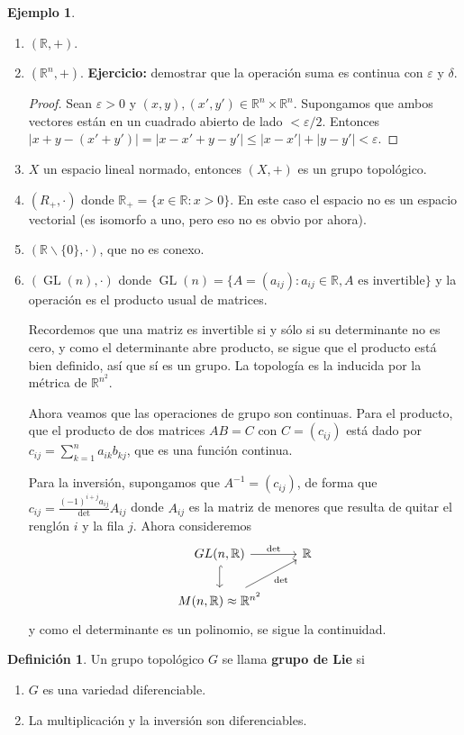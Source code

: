 \documentclass[spanish]{article}
\theoremstyle{definition}
\newtheorem*{defn}{Definición}
\newtheorem*{ejem}{Ejemplo}
\newcommand{\R}{\mathbb{R}}
\DeclareMathOperator{\GL}{GL}
\begin{document}
\begin{ejem}\leavevmode
	\begin{enumerate}
		\item $(\R,+)$.
		\item $(\R^n,+)$. \textbf{Ejercicio:} demostrar que la operación suma es continua con $\varepsilon$ y $\delta$.
		\begin{proof}
			Sean $\varepsilon>0$ y $(x,y),(x',y')\in\R^n\times\R^n$. Supongamos que ambos vectores están en un cuadrado abierto de lado $<\varepsilon/2$. Entonces $|x+y-(x'+y')|=|x-x'+y-y'|\leq|x-x'|+|y-y'|<\varepsilon$. 
		\end{proof}
		\item $X$ un espacio lineal normado, entonces $(X,+)$ es un grupo topológico.
		\item $(R_+,\cdot)$ donde $\R_+=\{x\in\R:x>0\}$. En este caso el espacio no es un espacio vectorial (es isomorfo a uno, pero eso no es obvio por ahora).
		\item $(\R\backslash\{0\},\cdot)$, que no es conexo.
		\item $(\GL(n),\cdot)$ donde $\GL(n)=\{A=(a_{ij}): a_{ij}\in\R, A\text{ es invertible}\}$ y la operación es el producto usual de matrices.
		
		Recordemos que una matriz es invertible si y sólo si su determinante no es cero, y como el determinante abre producto, se sigue que el producto está bien definido, así que sí es un grupo. La topología es la inducida por la métrica de $\R^{n^2}$. 
		
		Ahora veamos que las operaciones de grupo son continuas. Para el producto, que el producto de dos matrices $AB=C$ con $C=(c_{ij})$ está dado por $c_{ij}=\sum_{k=1}^na_{ik}b_{kj}$, que es una función continua.
		
		Para la inversión, supongamos que $A^{-1}=(c_{ij})$, de forma que $c_{ij}=\frac{(-1)^{i+j}a_{ij}}\det A_{ij}$ donde $A_{ij}$ es la matriz de menores que resulta de quitar el renglón $i$ y la fila $j$. Ahora consideremos
		\[\begin{tikzcd}
			GL(n,\R)\arrow[d,hook]\arrow[r,"\det"]&\R\\
			M(n,\R)\approx\R^{n^2}\arrow[ur,swap,"\det"]
		\end{tikzcd}\]
		y como el determinante es un polinomio, se sigue la continuidad.
	\end{enumerate}
\end{ejem}
\begin{defn}
	Un grupo topológico $G$ se llama \textbf{grupo de Lie} si
	\begin{enumerate}
		\item $G$ es una variedad diferenciable.
		\item La multiplicación y la inversión son diferenciables.
	\end{enumerate}
\end{defn}
\end{document}
